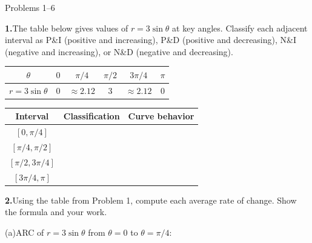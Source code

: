 \documentclass[10pt]{article}
\begin{document}
\namedateperiod

\vspace{0.10in}

\begin{notesbox}{Problems 1--6}

\textbf{1.}\quad The table below gives values of $r = 3\sin\theta$ at key angles.
Classify each adjacent interval as P\&I (positive and increasing),
P\&D (positive and decreasing), N\&I (negative and increasing), or N\&D
(negative and decreasing).

\vspace{6pt}
\renewcommand{\arraystretch}{1.5}
\begin{tabular}{|c|c|c|c|c|c|}
\hline
$\theta$ & $0$ & $\pi/4$ & $\pi/2$ & $3\pi/4$ & $\pi$ \\
\hline
$r = 3\sin\theta$ & $0$ & $\approx 2.12$ & $3$ & $\approx 2.12$ & $0$ \\
\hline
\end{tabular}

\vspace{4pt}
\begin{tabular}{|c|c|c|}
\hline
\textbf{Interval} & \textbf{Classification} & \textbf{Curve behavior} \\
\hline
$[0, \pi/4]$ & \underline{\hspace{2.5cm}} & \underline{\hspace{3.5cm}} \\
\hline
$[\pi/4, \pi/2]$ & \underline{\hspace{2.5cm}} & \underline{\hspace{3.5cm}} \\
\hline
$[\pi/2, 3\pi/4]$ & \underline{\hspace{2.5cm}} & \underline{\hspace{3.5cm}} \\
\hline
$[3\pi/4, \pi]$ & \underline{\hspace{2.5cm}} & \underline{\hspace{3.5cm}} \\
\hline
\end{tabular}

\vspace{0.14in}
\textbf{2.}\quad Using the table from Problem 1, compute each average rate of change.
Show the formula and your work.

\vspace{6pt}
(a)\quad ARC of $r = 3\sin\theta$ from $\theta = 0$ to $\theta = \pi/4$:


\end{notesbox}
\end{document}
